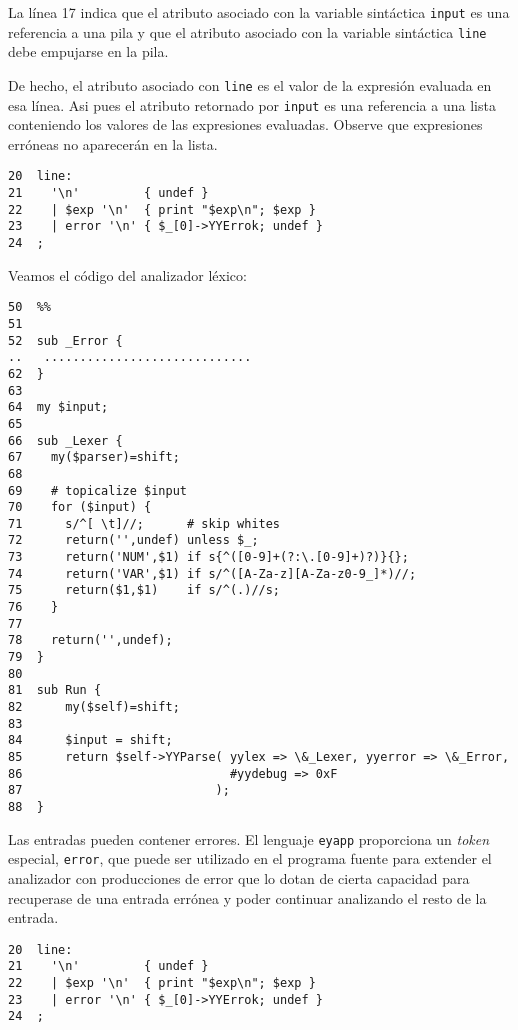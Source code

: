 La línea 17 indica que el atributo asociado con la variable
sintáctica \verb|input| es una referencia
a una pila y que el atributo asociado con la variable sintáctica
\verb|line| debe empujarse
en la pila. 

De hecho, el atributo asociado con \verb|line| es el valor
de la expresión evaluada en esa línea. Asi pues el atributo retornado por \verb|input| es
una referencia a una lista conteniendo los valores de las expresiones
evaluadas. Observe que expresiones erróneas no aparecerán en la lista.

\begin{verbatim}
20  line:
21    '\n'         { undef }
22    | $exp '\n'  { print "$exp\n"; $exp }
23    | error '\n' { $_[0]->YYErrok; undef }
24  ;
\end{verbatim}


Veamos el código del analizador
léxico:

\begin{verbatim}
50  %%
51
52  sub _Error {
..   .............................
62  }
63
64  my $input;
65
66  sub _Lexer {
67    my($parser)=shift;
68
69    # topicalize $input
70    for ($input) {
71      s/^[ \t]//;      # skip whites
72      return('',undef) unless $_;
73      return('NUM',$1) if s{^([0-9]+(?:\.[0-9]+)?)}{};
74      return('VAR',$1) if s/^([A-Za-z][A-Za-z0-9_]*)//;
75      return($1,$1)    if s/^(.)//s;
76    }
77
78    return('',undef);
79  }
80
81  sub Run {
82      my($self)=shift;
83
84      $input = shift;
85      return $self->YYParse( yylex => \&_Lexer, yyerror => \&_Error,
86                             #yydebug => 0xF
87                           );
88  }
\end{verbatim}



Las entradas pueden contener errores. 
El lenguaje \verb|eyapp| proporciona un \emph{token} especial,
\verb|error|, que puede ser utilizado en el programa fuente
para extender el analizador con producciones de error 
que lo dotan de cierta capacidad para 
recuperase de  una entrada errónea y poder continuar 
analizando el resto de la entrada.

\begin{verbatim}
20  line:
21    '\n'         { undef }
22    | $exp '\n'  { print "$exp\n"; $exp }
23    | error '\n' { $_[0]->YYErrok; undef }
24  ;
\end{verbatim}

